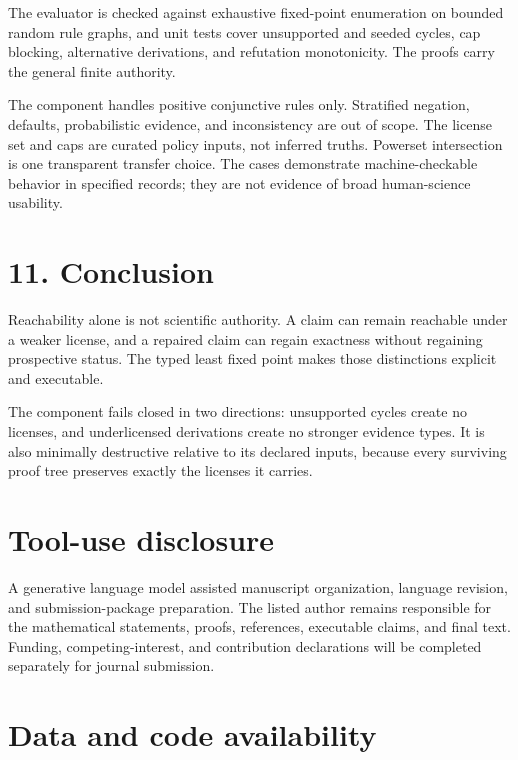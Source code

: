 \documentclass[
  11pt,
]{article}
\begin{document}
The evaluator is checked against exhaustive fixed-point enumeration on
bounded random rule graphs, and unit tests cover unsupported and seeded
cycles, cap blocking, alternative derivations, and refutation
monotonicity. The proofs carry the general finite authority.

The component handles positive conjunctive rules only. Stratified
negation, defaults, probabilistic evidence, and inconsistency are out of
scope. The license set and caps are curated policy inputs, not inferred
truths. Powerset intersection is one transparent transfer choice. The
cases demonstrate machine-checkable behavior in specified records; they
are not evidence of broad human-science usability.

\hypertarget{conclusion}{%
\section{11. Conclusion}\label{conclusion}}

Reachability alone is not scientific authority. A claim can remain
reachable under a weaker license, and a repaired claim can regain
exactness without regaining prospective status. The typed least fixed
point makes those distinctions explicit and executable.

The component fails closed in two directions: unsupported cycles create
no licenses, and underlicensed derivations create no stronger evidence
types. It is also minimally destructive relative to its declared inputs,
because every surviving proof tree preserves exactly the licenses it
carries.

\hypertarget{tool-use-disclosure}{%
\section{Tool-use disclosure}\label{tool-use-disclosure}}

A generative language model assisted manuscript organization, language
revision, and submission-package preparation. The listed author remains
responsible for the mathematical statements, proofs, references,
executable claims, and final text. Funding, competing-interest, and
contribution declarations will be completed separately for journal
submission.

\hypertarget{data-and-code-availability}{%
\section{Data and code availability}\label{data-and-code-availability}}
\end{document}
